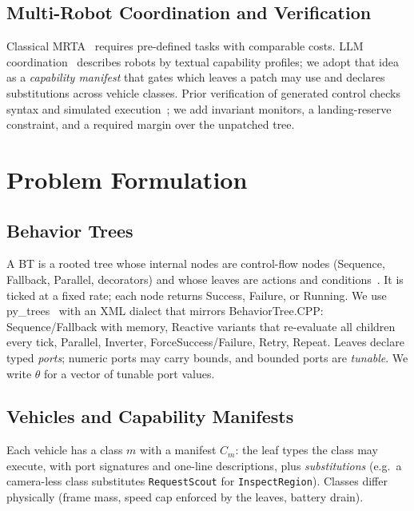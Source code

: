 \documentclass[conference]{IEEEtran}
\begin{document}
\subsection{Multi-Robot Coordination and Verification}
Classical MRTA~\cite{gerkey2004taxonomy,kuhn1955hungarian,gerkey2002sold,nunes2015tessi} requires pre-defined tasks with comparable costs. LLM coordination~\cite{mandi2024roco,chen2024scalable} describes robots by textual capability profiles; we adopt that idea as a \emph{capability manifest} that gates which leaves a patch may use and declares substitutions across vehicle classes. Prior verification of generated control checks syntax and simulated execution~\cite{izzo2024btgenbot}; we add invariant monitors, a landing-reserve constraint, and a required margin over the unpatched tree.

\section{Problem Formulation}
\label{sec:problem}

\subsection{Behavior Trees}
A BT is a rooted tree whose internal nodes are control-flow nodes (Sequence, Fallback, Parallel, decorators) and whose leaves are actions and conditions~\cite{colledanchise2018bt}. It is ticked at a fixed rate; each node returns Success, Failure, or Running. We use py\_trees~\cite{pytrees} with an XML dialect that mirrors BehaviorTree.CPP: Sequence/Fallback with memory, Reactive variants that re-evaluate all children every tick, Parallel, Inverter, ForceSuccess/Failure, Retry, Repeat. Leaves declare typed \emph{ports}; numeric ports may carry bounds, and bounded ports are \emph{tunable}. We write $\theta$ for a vector of tunable port values.

\subsection{Vehicles and Capability Manifests}
Each vehicle has a class $m$ with a manifest $C_m$: the leaf types the class may execute, with port signatures and one-line descriptions, plus \emph{substitutions} (e.g.\ a camera-less class substitutes \texttt{RequestScout} for \texttt{InspectRegion}). Classes differ physically (frame mass, speed cap enforced by the leaves, battery drain).
\end{document}
